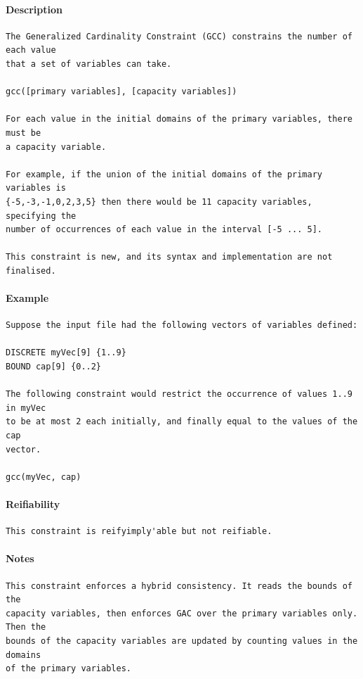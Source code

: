 \documentclass[oneside]{book}
\begin{document}
\paragraph{Description}
{\footnotesize
\begin{verbatim}
The Generalized Cardinality Constraint (GCC) constrains the number of each value
that a set of variables can take.

gcc([primary variables], [capacity variables])

For each value in the initial domains of the primary variables, there must be 
a capacity variable. 

For example, if the union of the initial domains of the primary variables is
{-5,-3,-1,0,2,3,5} then there would be 11 capacity variables, specifying the
number of occurrences of each value in the interval [-5 ... 5].

This constraint is new, and its syntax and implementation are not finalised.
\end{verbatim}
}
\paragraph{Example}
{\footnotesize
\begin{verbatim}
Suppose the input file had the following vectors of variables defined:

DISCRETE myVec[9] {1..9}
BOUND cap[9] {0..2}

The following constraint would restrict the occurrence of values 1..9 in myVec
to be at most 2 each initially, and finally equal to the values of the cap
vector.

gcc(myVec, cap)
\end{verbatim}
}
\paragraph{Reifiability}
{\footnotesize
\begin{verbatim}
This constraint is reifyimply'able but not reifiable.
\end{verbatim}
}
\paragraph{Notes}
{\footnotesize
\begin{verbatim}
This constraint enforces a hybrid consistency. It reads the bounds of the
capacity variables, then enforces GAC over the primary variables only.  Then the
bounds of the capacity variables are updated by counting values in the domains
of the primary variables.
\end{verbatim}
}
\end{document}
